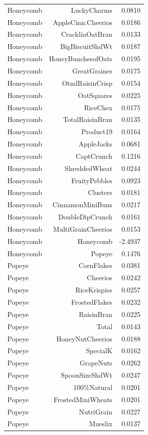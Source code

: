 \begin{longtable}{@{}lrr@{}}
Honeycomb & LuckyCharms & 0.0810 \\
Honeycomb & AppleCinn.Cheerios & 0.0186 \\
Honeycomb & CracklinOatBran & 0.0133 \\
Honeycomb & BigBiscuitShdWt & 0.0187 \\
Honeycomb & HoneyBunchesofOats & 0.0195 \\
Honeycomb & GreatGraines & 0.0175 \\
Honeycomb & OtmlRaisinCrisp & 0.0154 \\
Honeycomb & OatSquares & 0.0225 \\
Honeycomb & RiceChex & 0.0175 \\
Honeycomb & TotalRaisinBran & 0.0135 \\
Honeycomb & Product19 & 0.0164 \\
Honeycomb & AppleJacks & 0.0681 \\
Honeycomb & CaptCrunch & 0.1216 \\
Honeycomb & ShreddedWheat & 0.0244 \\
Honeycomb & FruityPebbles & 0.0923 \\
Honeycomb & Clusters & 0.0181 \\
Honeycomb & CinnamonMiniBuns & 0.0217 \\
Honeycomb & DoubleDipCrunch & 0.0161 \\
Honeycomb & MultiGrainCheerios & 0.0153 \\
Honeycomb & Honeycomb & -2.4937 \\
Honeycomb & Popeye & 0.1476 \\
Popeye & CornFlakes & 0.0381 \\
Popeye & Cheerios & 0.0242 \\
Popeye & RiceKrispies & 0.0257 \\
Popeye & FrostedFlakes & 0.0232 \\
Popeye & RaisinBran & 0.0225 \\
Popeye & Total & 0.0143 \\
Popeye & HoneyNutCheerios & 0.0188 \\
Popeye & SpecialK & 0.0162 \\
Popeye & GrapeNuts & 0.0262 \\
Popeye & SpoonSizeShdWt & 0.0247 \\
Popeye & 100\%Natural & 0.0201 \\
Popeye & FrostedMiniWheats & 0.0201 \\
Popeye & NutriGrain & 0.0227 \\
Popeye & Mueslix & 0.0137 \\

\end{longtable}
